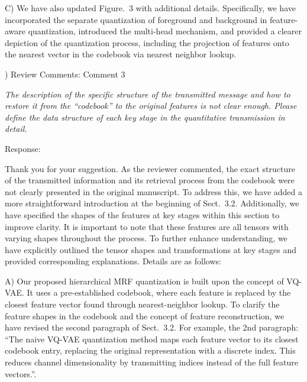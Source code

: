 \documentclass[12pt,a4paper]{article}
\begin{document}
C) We have also updated Figure.~3 with additional details. Specifically, we have incorporated the separate quantization of foreground and background in feature-aware quantization, introduced the multi-head mechanism, and provided a clearer depiction of the quantization process, including the projection of features onto the nearest vector in the codebook via nearest neighbor lookup.

\vspace{4ex}
) Review Comments: Comment 3

\textit{The description of the specific structure of the transmitted message and how to restore it from the ``codebook'' to the original features is not clear enough. Please define the data structure of each key stage in the quantitative transmission in detail.}

\noindent Response:

Thank you for your suggestion. As the reviewer commented, the exact structure of the transmitted information and its retrieval process from the codebook were not clearly presented in the original manuscript. To address this, we have added a more straightforward introduction at the beginning of Sect.~3.2. Additionally, we have specified the shapes of the features at key stages within this section to improve clarity. It is important to note that these features are all tensors with varying shapes throughout the process. To further enhance understanding, we have explicitly outlined the tensor shapes and transformations at key stages and provided corresponding explanations. Details are as follows:

A) Our proposed hierarchical MRF quantization is built upon the concept of VQ-VAE. It uses a pre-established codebook, where each feature is replaced by the closest feature vector found through nearest-neighbor lookup. To clarify the feature shapes in the codebook and the concept of feature reconstruction, we have revised the second paragraph of Sect.~3.2. For example, the 2nd paragraph: ``The naive VQ-VAE quantization method maps each feature vector to its closest codebook entry, replacing the original representation with a discrete index. This reduces channel dimensionality by transmitting indices instead of the full feature vectors.''. 
\end{document}

